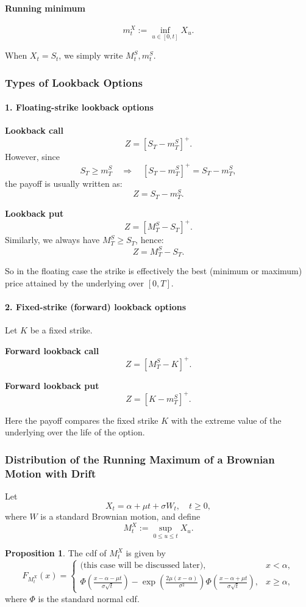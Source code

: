 \documentclass[12pt,a4paper]{article}
\theoremstyle{definition}
\newtheorem{proposition}{Proposition}[section]
\begin{document}
\paragraph{Running minimum}
\[
m_t^X := \inf_{u \in [0,t]} X_u.
\]

When $X_t = S_t$, we simply write $M_t^S, m_t^S$.

\subsubsection{Types of Lookback Options}

\paragraph{1. Floating-strike lookback options}

\textbf{Lookback call}
\[
Z = [S_T - m_T^S]^+.
\]
However, since
\[
S_T \geq m_T^S \quad \Longrightarrow \quad [S_T - m_T^S]^+ = S_T - m_T^S,
\]
the payoff is usually written as:
\[
Z = S_T - m_T^S.
\]

\textbf{Lookback put}
\[
Z = [M_T^S - S_T]^+.
\]
Similarly, we always have $M_T^S \geq S_T$, hence:
\[
Z = M_T^S - S_T.
\]

So in the floating case the strike is effectively the best (minimum or maximum) price attained by the underlying over $[0,T]$.

\paragraph{2. Fixed-strike (forward) lookback options}

Let $K$ be a fixed strike.

\textbf{Forward lookback call}
\[
Z = [M_T^S - K]^+.
\]

\textbf{Forward lookback put}
\[
Z = [K - m_T^S]^+.
\]

Here the payoff compares the fixed strike $K$ with the extreme value of the underlying over the life of the option.

\subsubsection{Distribution of the Running Maximum of a Brownian Motion with Drift}

Let
\[
X_t = \alpha + \mu t + \sigma W_t, \quad t \geq 0,
\]
where $W$ is a standard Brownian motion, and define
\[
M_t^X := \sup_{0 \leq u \leq t} X_u.
\]

\begin{proposition}
The cdf of $M_t^X$ is given by
\[
F_{M_t^X}(x) = 
\begin{cases}
\text{(this case will be discussed later)}, & x < \alpha, \\[6pt]
\Phi\!\left(\frac{x - \alpha - \mu t}{\sigma\sqrt{t}}\right) - \exp\!\left(\frac{2\mu(x - \alpha)}{\sigma^2}\right) \Phi\!\left(\frac{x - \alpha + \mu t}{\sigma\sqrt{t}}\right), & x \geq \alpha,
\end{cases}
\]
where $\Phi$ is the standard normal cdf.
\end{proposition}
\end{document}
